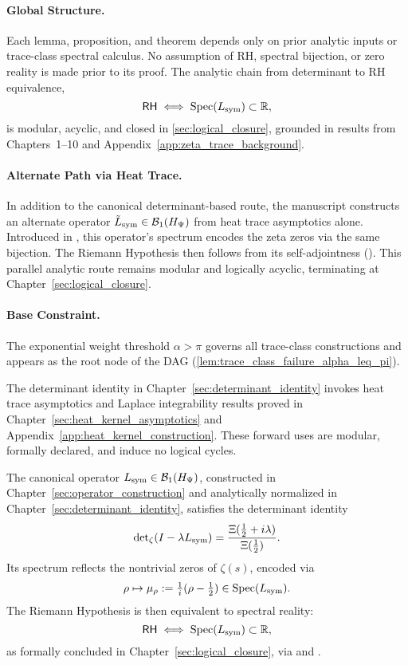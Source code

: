 \paragraph{Global Structure.}
Each lemma, proposition, and theorem depends only on prior analytic inputs or trace-class spectral calculus. No assumption of RH, spectral bijection, or zero reality is made prior to its proof. The analytic chain from determinant to RH equivalence,
\[
\mathsf{RH} \iff \operatorname{Spec}(L_{\mathrm{sym}}) \subset \mathbb{R},
\]
is modular, acyclic, and closed in \cref{sec:logical_closure}, grounded in results from Chapters~1–10 and Appendix~\ref{app:zeta_trace_background}.

\paragraph{Alternate Path via Heat Trace.}
In addition to the canonical determinant-based route, the manuscript constructs an alternate operator \( \tilde{L}_{\mathrm{sym}} \in \mathcal{B}_1(H_{\Psi}) \) from heat trace asymptotics alone. Introduced in , this operator’s spectrum encodes the zeta zeros via the same bijection. The Riemann Hypothesis then follows from its self-adjointness (). This parallel analytic route remains modular and logically acyclic, terminating at Chapter~\ref{sec:logical_closure}.

\paragraph{Base Constraint.}
The exponential weight threshold \( \alpha > \pi \) governs all trace-class constructions and appears as the root node of the DAG (\cref{lem:trace_class_failure_alpha_leq_pi}).

\begin{remark}
The determinant identity in Chapter~\ref{sec:determinant_identity} invokes heat trace asymptotics and Laplace integrability results proved in Chapter~\ref{sec:heat_kernel_asymptotics} and Appendix~\ref{app:heat_kernel_construction}. These forward uses are modular, formally declared, and induce no logical cycles.
\end{remark}

\medskip

\begin{tcolorbox}[colback=gray!2!white, colframe=black!50, title={\textbf{Canonical Equivalence — RH via Spectral Reality}}]
The canonical operator \( L_{\mathrm{sym}} \in \mathcal{B}_1(H_{\Psi}) \), constructed in Chapter~\ref{sec:operator_construction} and analytically normalized in Chapter~\ref{sec:determinant_identity}, satisfies the determinant identity
\[
\det\nolimits_{\zeta}(I - \lambda L_{\mathrm{sym}}) = \frac{\Xi(\tfrac{1}{2} + i\lambda)}{\Xi(\tfrac{1}{2})}.
\]
Its spectrum reflects the nontrivial zeros of \( \zeta(s) \), encoded via
\[
\rho \mapsto \mu_\rho := \tfrac{1}{i}(\rho - \tfrac{1}{2}) \in \operatorname{Spec}(L_{\mathrm{sym}}).
\]
The Riemann Hypothesis is then equivalent to spectral reality:
\[
\mathsf{RH} \iff \operatorname{Spec}(L_{\mathrm{sym}}) \subset \mathbb{R},
\]
as formally concluded in Chapter~\ref{sec:logical_closure}, via  and .
\end{tcolorbox}

